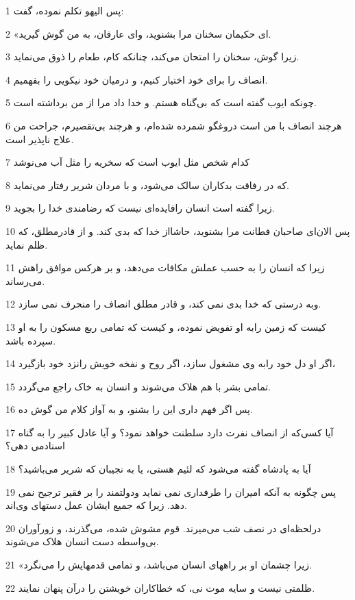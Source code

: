 \par 1 پس الیهو تکلم نموده، گفت:
\par 2 «ای حکیمان سخنان مرا بشنوید، و‌ای عارفان، به من گوش گیرید.
\par 3 زیرا گوش، سخنان را امتحان می‌کند، چنانکه کام، طعام را ذوق می‌نماید.
\par 4 انصاف را برای خود اختیار کنیم، و درمیان خود نیکویی را بفهمیم.
\par 5 چونکه ایوب گفته است که بی‌گناه هستم. و خدا داد مرا از من برداشته است.
\par 6 هرچند انصاف با من است دروغگو شمرده شده‌ام، و هرچند بی‌تقصیرم، جراحت من علاج ناپذیر است.
\par 7 کدام شخص مثل ایوب است که سخریه را مثل آب می‌نوشد
\par 8 که در رفاقت بدکاران سالک می‌شود، و با مردان شریر رفتار می‌نماید.
\par 9 زیرا گفته است انسان رافایده‌ای نیست که رضامندی خدا را بجوید.
\par 10 پس الان‌ای صاحبان فطانت مرا بشنوید، حاشااز خدا که بدی کند. و از قادرمطلق، که ظلم نماید.
\par 11 زیرا که انسان را به حسب عملش مکافات می‌دهد، و بر هرکس موافق راهش می‌رساند. 
\par 12 وبه درستی که خدا بدی نمی کند، و قادر مطلق انصاف را منحرف نمی سازد.
\par 13 کیست که زمین رابه او تفویض نموده، و کیست که تمامی ربع مسکون را به او سپرده باشد.
\par 14 اگر او دل خود رابه وی مشغول سازد، اگر روح و نفخه خویش رانزد خود بازگیرد،
\par 15 تمامی بشر با هم هلاک می‌شوند و انسان به خاک راجع می‌گردد.
\par 16 پس اگر فهم داری این را بشنو، و به آواز کلام من گوش ده.
\par 17 آیا کسی‌که از انصاف نفرت دارد سلطنت خواهد نمود؟ و آیا عادل کبیر را به گناه اسنادمی دهی؟
\par 18 آیا به پادشاه گفته می‌شود که لئیم هستی، یا به نجیبان که شریر می‌باشید؟
\par 19 پس چگونه به آنکه امیران را طرفداری نمی نماید ودولتمند را بر فقیر ترجیح نمی دهد. زیرا که جمیع ایشان عمل دستهای وی‌اند.
\par 20 درلحظه‌ای در نصف شب می‌میرند. قوم مشوش شده، می‌گذرند، و زورآوران بی‌واسطه دست انسان هلاک می‌شوند.
\par 21 «زیرا چشمان او بر راههای انسان می‌باشد، و تمامی قدمهایش را می‌نگرد.
\par 22 ظلمتی نیست و سایه موت نی، که خطاکاران خویشتن را درآن پنهان نمایند.
